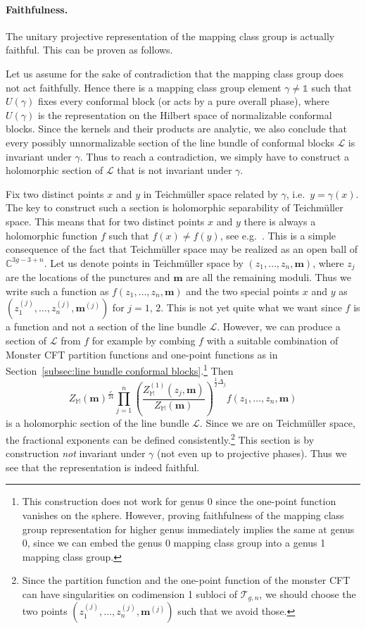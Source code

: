 \documentclass[12pt,a4paper]{article}
\newcommand{\be}{\begin{equation}}
\newcommand{\ee}{\end{equation}}
\newcommand\CC{\mathbb{C}}
\newcommand\id{\mathds{1}}
\begin{document}
\paragraph{Faithfulness.} 
The unitary projective representation of the mapping class group is actually faithful. This can be proven as follows.

Let us assume for the sake of contradiction that the mapping class group does not act faithfully. Hence there is a mapping class group element $\gamma \ne \id$ such that $U(\gamma)$ fixes every conformal block (or acts by a pure overall phase), where $U(\gamma)$ is the representation on the Hilbert space of normalizable conformal blocks. Since the kernels and their products are analytic, we also conclude that every possibly unnormalizable section of the line bundle of conformal blocks $\mathscr{L}$ is invariant under $\gamma$. Thus to reach a contradiction, we simply have to construct a holomorphic section of $\mathscr{L}$ that is not invariant under $\gamma$.

Fix two distinct points $x$ and $y$ in Teichm\"uller space related by $\gamma$, i.e.\ $y=\gamma(x)$. The key to construct such a section is holomorphic separability of Teichm\"uller space. This means that for two distinct points $x$ and $y$ there is always a holomorphic function $f$ such that $f(x) \ne f(y)$, see e.g.\ \cite{Bers1961}. This is a simple consequence of the fact that Teichm\"uller space may be realized as an open ball of $\CC^{3g-3+n}$. Let us denote points in Teichm\"uller space by $(z_1,\dots,z_n,\mathbf{m})$, where $z_j$ are the locations of the punctures and $\mathbf{m}$ are all the remaining moduli. Thus we write such a function as $f(z_1,\dots,z_n,\mathbf{m})$ and the two special points $x$ and $y$ as $(z_1^{(j)},\dots,z_n^{(j)},\mathbf{m}^{(j)})$ for $j=1,\, 2$. This is not yet quite what we want since $f$ is a function and not a section of the line bundle $\mathscr{L}$. However, we can produce a section of $\mathscr{L}$ from $f$ for example by combing $f$ with a suitable combination of Monster CFT partition functions and one-point functions as in Section~\ref{subsec:line bundle conformal blocks}.\footnote{This construction does not work for genus 0 since the one-point function vanishes on the sphere. However, proving faithfulness of the mapping class group representation for higher genus immediately implies the same at genus 0, since we can embed the genus 0 mapping class group into a genus 1 mapping class group.} 
Then
\be 
Z_{\mathbb{M}}(\mathbf{m})^{\frac{c}{24}}\prod_{j=1}^n \left(\frac{Z_{\mathbb{M}}^{(1)}(z_j,\mathbf{m})}{Z_{\mathbb{M}}(\mathbf{m})}\right)^{\frac{1}{2}\Delta_j} f(z_1,\dots,z_n,\mathbf{m})
\ee
is a holomorphic section of the line bundle $\mathscr{L}$. Since we are on Teichm\"uller space, the fractional exponents can be defined consistently.\footnote{Since the partition function and the one-point function of the monster CFT can have singularities on codimension 1 subloci of $\mathcal{T}_{g,n}$, we should choose the two points $(z_1^{(j)},\dots,z_n^{(j)},\mathbf{m}^{(j)})$ such that we avoid those.} This section is by construction \emph{not} invariant under $\gamma$ (not even up to projective phases). Thus we see that the representation is indeed faithful.
\end{document}
